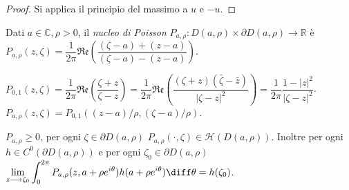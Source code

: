 \begin{proof}
  Si applica il principio del massimo a $u$ e $-u$.
\end{proof}

\begin{defn}
  Dati $a \in \mathbb{C}, \rho>0$, il \textit{nucleo di Poisson} $P_{a,\rho}:D(a,\rho)\times\partial D(a,\rho) \longrightarrow \mathbb{R}$ è $P_{a,\rho}(z, \zeta)=\dfrac{1}{2\pi}\mathfrak{Re}\left(\dfrac{(\zeta-a)+(z-a)}{(\zeta-a)-(z-a)}\right)$.
\end{defn}

\begin{oss} \label{P01}
  $P_{0,1}(z,\zeta)=\dfrac{1}{2\pi}\mathfrak{Re}\left(\dfrac{\zeta+z}{\zeta-z}\right)=\dfrac{1}{2\pi}\mathfrak{Re}\left(\dfrac{(\zeta+z)(\bar{\zeta}-\bar{z})}{|\zeta-z|^2}\right)=\dfrac{1}{2\pi}\dfrac{1-|z|^2}{|\zeta-z|^2}$.
  $P_{a,\rho}(z,\zeta)=P_{0,1}((z-a)/\rho,(\zeta-a)/\rho)$.
\end{oss}

\begin{prop} \label{prop_nuc}
  $P_{a, \rho} \ge 0$, per ogni $\zeta \in \partial D(a, \rho)$ $P_{a, \rho}(\cdot,\zeta) \in \mathcal{H}(D(a,\rho))$.
  Inoltre per ogni $h \in C^0(\partial D(a,\rho))$ e per ogni $\zeta_0 \in \partial D(a,\rho)$ $\displaystyle \lim_{z \longrightarrow \zeta_0} \int_0^{2\pi} P_{a,\rho}(z,a+\rho e^{i\theta})h(a+\rho e^{i\theta})\diff\theta=h(\zeta_0)$.
\end{prop}

